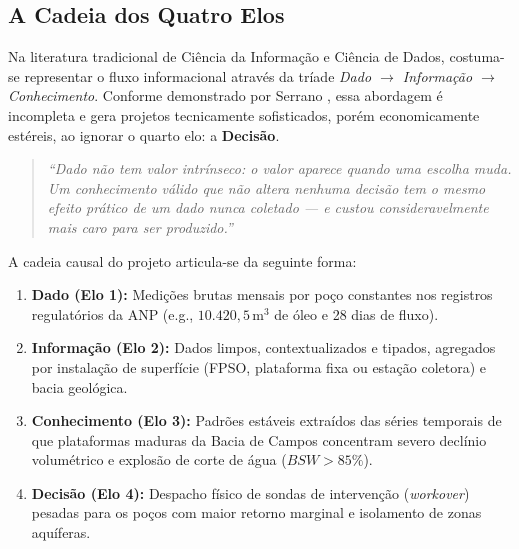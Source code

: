 \documentclass[12pt,a4paper]{article}
\begin{document}
\subsection{A Cadeia dos Quatro Elos}
Na literatura tradicional de Ciência da Informação e Ciência de Dados, costuma-se representar o fluxo informacional através da tríade \textit{Dado $\rightarrow$ Informação $\rightarrow$ Conhecimento}. Conforme demonstrado por Serrano \cite{serrano2026}, essa abordagem é incompleta e gera projetos tecnicamente sofisticados, porém economicamente estéreis, ao ignorar o quarto elo: a \textbf{Decisão}.
\begin{quote}
    \textit{``Dado não tem valor intrínseco: o valor aparece quando uma escolha muda. Um conhecimento válido que não altera nenhuma decisão tem o mesmo efeito prático de um dado nunca coletado — e custou consideravelmente mais caro para ser produzido.''} \cite{serrano2026}
\end{quote}

A cadeia causal do projeto articula-se da seguinte forma:
\begin{enumerate}[leftmargin=*]
    \item \textbf{Dado (Elo 1):} Medições brutas mensais por poço constantes nos registros regulatórios da ANP (e.g., $10.420,5\,\text{m}^3$ de óleo e 28 dias de fluxo).
    \item \textbf{Informação (Elo 2):} Dados limpos, contextualizados e tipados, agregados por instalação de superfície (FPSO, plataforma fixa ou estação coletora) e bacia geológica.
    \item \textbf{Conhecimento (Elo 3):} Padrões estáveis extraídos das séries temporais de que plataformas maduras da Bacia de Campos concentram severo declínio volumétrico e explosão de corte de água ($BSW > 85\%$).
    \item \textbf{Decisão (Elo 4):} Despacho físico de sondas de intervenção (\textit{workover}) pesadas para os poços com maior retorno marginal e isolamento de zonas aquíferas.
\end{enumerate}
\end{document}
